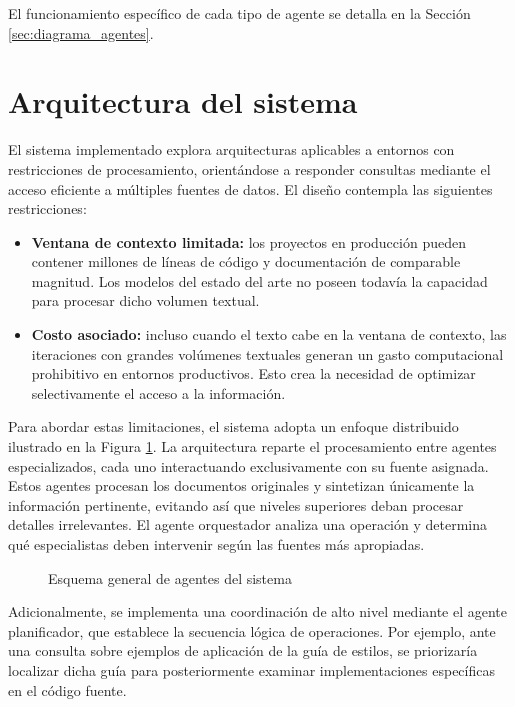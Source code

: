 El funcionamiento específico de cada tipo de agente se detalla en la Sección \ref{sec:diagrama_agentes}.

\section{Arquitectura del sistema}
El sistema implementado explora arquitecturas aplicables a entornos con restricciones de procesamiento, orientándose a responder consultas mediante el acceso eficiente a múltiples fuentes de datos. El diseño contempla las siguientes restricciones:
\begin{itemize}
\item\textbf{Ventana de contexto limitada: }los proyectos en producción pueden contener millones de líneas de código y documentación de comparable magnitud. Los modelos del estado del arte no poseen todavía la capacidad para procesar dicho volumen textual.
\item\textbf{Costo asociado: }incluso cuando el texto cabe en la ventana de contexto, las iteraciones con grandes volúmenes textuales generan un gasto computacional prohibitivo en entornos productivos. Esto crea la necesidad de optimizar selectivamente el acceso a la información.
\end{itemize}
Para abordar estas limitaciones, el sistema adopta un enfoque distribuido ilustrado en la Figura \ref{fig:agentes}. La arquitectura reparte el procesamiento entre agentes especializados, cada uno interactuando exclusivamente con su fuente asignada.
Estos agentes procesan los documentos originales y sintetizan únicamente la información pertinente, evitando así que niveles superiores deban procesar detalles irrelevantes. El agente orquestador analiza una operación y determina qué especialistas deben intervenir según las fuentes más apropiadas.
\begin{figure}[h]
\centering
{}
\caption{Esquema general de agentes del sistema}
\label{fig:agentes}
\end{figure}

Adicionalmente, se implementa una coordinación de alto nivel mediante el agente planificador, que establece la secuencia lógica de operaciones. Por ejemplo, ante una consulta sobre ejemplos de aplicación de la guía de estilos, se priorizaría localizar dicha guía para posteriormente examinar implementaciones específicas en el código fuente.

